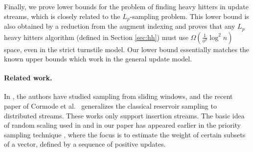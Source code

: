 \documentclass[9pt,letterpaper]{article}
\theoremstyle{remark}
\DeclareMathOperator{\UR}{UR}
\begin{document}


Finally, we prove lower bounds for the problem of finding heavy hitters in update streams, 
which is closely related to the $L_p$-sampling problem. This lower bound is also obtained 
by a reduction from the augment indexing and proves that any $L_p$ heavy 
hitters algorithm (defined in Section \ref{sec:hh}) must use 
$\Omega(\frac{1}{\phi^p}\log^2 n)$ space, even in the strict turnstile model. 
Our lower bound essentially matches the known upper bounds \cite{CormodeM05,CharikarCF04,KaneNPW} which work in the general update model. 

\paragraph{Related work.} In \cite{BabcockDM02,BravermanOZ09}, the authors have 
studied sampling from sliding windows, and the recent paper
of Cormode et al.\ \cite{CormodeMYZ10} generalizes the classical reservoir sampling 
to distributed streams. These works only support insertion streams.
 The basic idea of random scaling used in \cite{AndoniKO10} and in our paper has appeared earlier in
 the priority sampling technique \cite{DuffieldLT07,CohenDKLT09}, where the focus is
 to estimate the weight of certain subsets of a vector, defined by a sequence of positive updates.
 
\end{document}
